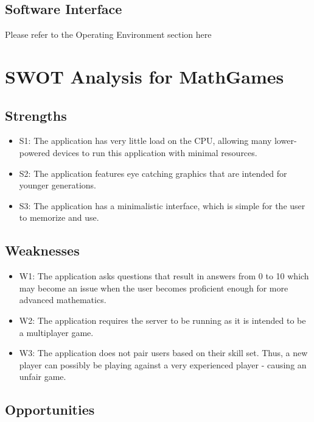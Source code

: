 \documentclass[12pt]{article}
\begin{document}
\subsection{Software Interface}

Please refer to the Operating Environment section here \underline{}

\newpage

\section{SWOT Analysis for MathGames}

\subsection{Strengths}

\begin{itemize}
\item S1: The application has very little load on the CPU, allowing many lower-powered devices to run this application with minimal resources.
\item S2: The application features eye catching graphics that are intended for younger generations.
\item S3: The application has a minimalistic interface, which is simple for the user to memorize and use.
\end{itemize}

\subsection{Weaknesses}

\begin{itemize}
\item W1: The application asks questions that result in answers from 0 to 10 which may become an issue when the user becomes proficient enough for more advanced mathematics.
\item W2: The application requires the server to be running as it is intended to be a multiplayer game.
\item W3: The application does not pair users based on their skill set. Thus, a new player can possibly be playing against a very experienced player - causing an unfair game.
\end{itemize}

\subsection{Opportunities}
\end{document}
